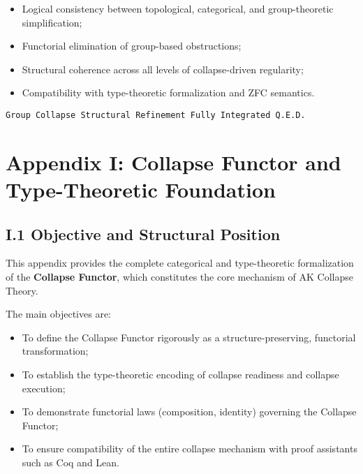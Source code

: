 \documentclass[11pt]{article}
\begin{document}
\begin{itemize}
    \item Logical consistency between topological, categorical, and group-theoretic simplification;
    \item Functorial elimination of group-based obstructions;
    \item Structural coherence across all levels of collapse-driven regularity;
    \item Compatibility with type-theoretic formalization and ZFC semantics.
\end{itemize}

\begin{flushright}
\texttt{Group Collapse Structural Refinement \quad Fully Integrated \quad Q.E.D.}
\end{flushright}



\section*{Appendix I: Collapse Functor and Type-Theoretic Foundation}

\subsection*{I.1 Objective and Structural Position}

This appendix provides the complete categorical and type-theoretic formalization of the \textbf{Collapse Functor}, which constitutes the core mechanism of AK Collapse Theory.

The main objectives are:

\begin{itemize}
    \item To define the Collapse Functor rigorously as a structure-preserving, functorial transformation;
    \item To establish the type-theoretic encoding of collapse readiness and collapse execution;
    \item To demonstrate functorial laws (composition, identity) governing the Collapse Functor;
    \item To ensure compatibility of the entire collapse mechanism with proof assistants such as Coq and Lean.
\end{itemize}
\end{document}
